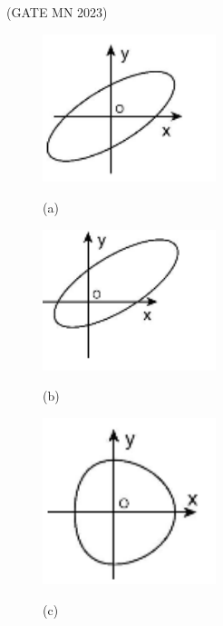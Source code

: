 \documentclass[journal]{IEEEtran}
\begin{document}
\begin{enumerate}
\hfill(GATE MN 2023)
\begin{multicols}{2}
	
	\begin{figure}[H]
\includegraphics[width=0.45\textwidth]{Screenshot_2025_0822_110218.png} \\
		\caption*{(a)}
\label{fig:Q5option1}
 \end{figure}

\begin{figure}[H]
\includegraphics[width=0.45\textwidth]{Screenshot_2025_0822_110239.png} \\
	\caption*{(b)}
  \label{fig:Q5option2}
  \end{figure}

\begin{figure}[H]
\includegraphics[width=0.45\textwidth]{Screenshot_2025_0822_110301.png} \\
	\caption*{(c)}
  \label{fig:Q5option3}
  \end{figure}


\end{multicols}
\end{enumerate}
\end{document}
